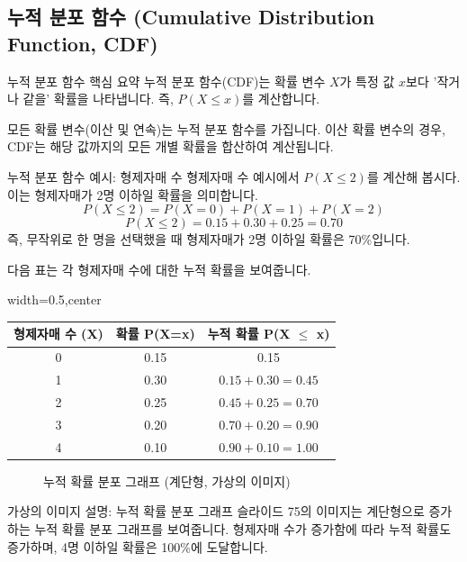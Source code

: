 \documentclass[11pt,a4paper]{article}
\theoremstyle{definition}
\begin{document}
\subsection{누적 분포 함수 (Cumulative Distribution Function, CDF)}

\begin{summarybox}{누적 분포 함수 핵심 요약}
누적 분포 함수(CDF)는 확률 변수 \(X\)가 특정 값 \(x\)보다 '작거나 같을' 확률을 나타냅니다. 즉, \(P(X \le x)\)를 계산합니다.
\end{summarybox}

모든 확률 변수(이산 및 연속)는 누적 분포 함수를 가집니다. 이산 확률 변수의 경우, CDF는 해당 값까지의 모든 개별 확률을 합산하여 계산됩니다.

\begin{examplebox}{누적 분포 함수 예시: 형제자매 수}
형제자매 수 예시에서 \(P(X \le 2)\)를 계산해 봅시다. 이는 형제자매가 2명 이하일 확률을 의미합니다.
\[ P(X \le 2) = P(X=0) + P(X=1) + P(X=2) \]
\[ P(X \le 2) = 0.15 + 0.30 + 0.25 = 0.70 \]
즉, 무작위로 한 명을 선택했을 때 형제자매가 2명 이하일 확률은 70\%입니다.

다음 표는 각 형제자매 수에 대한 누적 확률을 보여줍니다.

\begin{adjustbox}{width=0.5\textwidth,center}
\begin{tabular}{ccc}
\toprule
\textbf{형제자매 수 (X)} & \textbf{확률 P(X=x)} & \textbf{누적 확률 P(X \(\le\) x)} \\
\midrule
0 & 0.15 & 0.15 \\
1 & 0.30 & \(0.15 + 0.30 = 0.45\) \\
2 & 0.25 & \(0.45 + 0.25 = 0.70\) \\
3 & 0.20 & \(0.70 + 0.20 = 0.90\) \\
4 & 0.10 & \(0.90 + 0.10 = 1.00\) \\
\bottomrule
\end{tabular}
\end{adjustbox}

\begin{figure}[h!]
    \centering
    \caption{누적 확률 분포 그래프 (계단형, 가상의 이미지)}
    \label{fig:cdf_plot}
\end{figure}
\begin{infobox}{가상의 이미지 설명: 누적 확률 분포 그래프}
슬라이드 75의 이미지는 계단형으로 증가하는 누적 확률 분포 그래프를 보여줍니다. 형제자매 수가 증가함에 따라 누적 확률도 증가하며, 4명 이하일 확률은 100\%에 도달합니다.
\end{infobox}
\end{examplebox}
\end{document}

